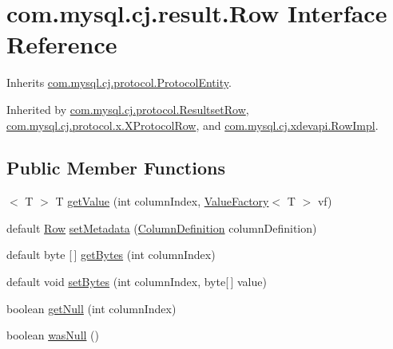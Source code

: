 \hypertarget{interfacecom_1_1mysql_1_1cj_1_1result_1_1_row}{}\section{com.\+mysql.\+cj.\+result.\+Row Interface Reference}
\label{interfacecom_1_1mysql_1_1cj_1_1result_1_1_row}


Inherits \mbox{\hyperlink{interfacecom_1_1mysql_1_1cj_1_1protocol_1_1_protocol_entity}{com.\+mysql.\+cj.\+protocol.\+Protocol\+Entity}}.



Inherited by \mbox{\hyperlink{interfacecom_1_1mysql_1_1cj_1_1protocol_1_1_resultset_row}{com.\+mysql.\+cj.\+protocol.\+Resultset\+Row}}, \mbox{\hyperlink{classcom_1_1mysql_1_1cj_1_1protocol_1_1x_1_1_x_protocol_row}{com.\+mysql.\+cj.\+protocol.\+x.\+X\+Protocol\+Row}}, and \mbox{\hyperlink{classcom_1_1mysql_1_1cj_1_1xdevapi_1_1_row_impl}{com.\+mysql.\+cj.\+xdevapi.\+Row\+Impl}}.

\subsection*{Public Member Functions}
\begin{DoxyCompactItemize}
\item 
$<$ T $>$ T \mbox{\hyperlink{interfacecom_1_1mysql_1_1cj_1_1result_1_1_row_adb3bafc1a031d4ea40a2123f6cc42aba}{get\+Value}} (int column\+Index, \mbox{\hyperlink{interfacecom_1_1mysql_1_1cj_1_1result_1_1_value_factory}{Value\+Factory}}$<$ T $>$ vf)
\item 
default \mbox{\hyperlink{interfacecom_1_1mysql_1_1cj_1_1result_1_1_row}{Row}} \mbox{\hyperlink{interfacecom_1_1mysql_1_1cj_1_1result_1_1_row_ab80b0f47123d2771840acead9bc094d0}{set\+Metadata}} (\mbox{\hyperlink{interfacecom_1_1mysql_1_1cj_1_1protocol_1_1_column_definition}{Column\+Definition}} column\+Definition)
\item 
default byte \mbox{[}$\,$\mbox{]} \mbox{\hyperlink{interfacecom_1_1mysql_1_1cj_1_1result_1_1_row_a063918cd10fe7c3ef5df95b33e21f19e}{get\+Bytes}} (int column\+Index)
\item 
default void \mbox{\hyperlink{interfacecom_1_1mysql_1_1cj_1_1result_1_1_row_aaa1223e3df4e0f2b1b383d86095e7789}{set\+Bytes}} (int column\+Index, byte\mbox{[}$\,$\mbox{]} value)
\item 
boolean \mbox{\hyperlink{interfacecom_1_1mysql_1_1cj_1_1result_1_1_row_aaf07357d53c30067dfa87183a1e60a18}{get\+Null}} (int column\+Index)
\item 
boolean \mbox{\hyperlink{interfacecom_1_1mysql_1_1cj_1_1result_1_1_row_a6a915f3dfaf8f9997f705b7762f9c6cb}{was\+Null}} ()
\end{DoxyCompactItemize}


